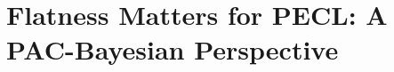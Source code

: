 \documentclass{article} %
\begin{document}

\section{Flatness Matters for PECL: A PAC-Bayesian Perspective}
\label{section PAC}
\end{document}
